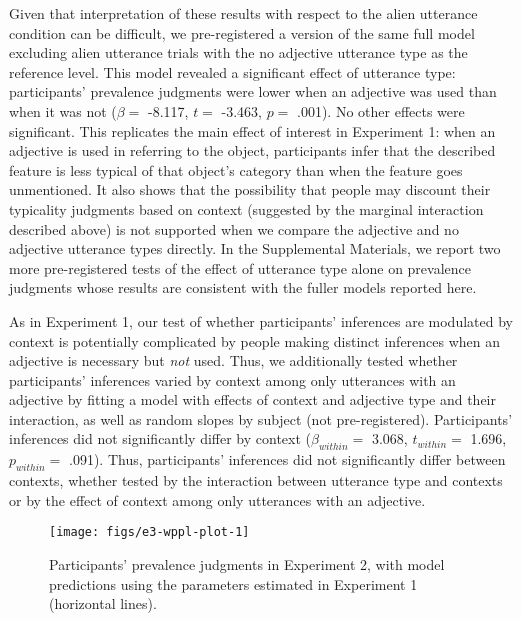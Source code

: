 \documentclass{ucetd}
\begin{document}
Given that interpretation of these results with respect to the alien
utterance condition can be difficult, we pre-registered a version of the
same full model excluding alien utterance trials with the no adjective
utterance type as the reference level. This model revealed a significant
effect of utterance type: participants' prevalence judgments were lower
when an adjective was used than when it was not (\(\beta =\) -8.117,
\(t =\) -3.463, \(p =\) .001). No other effects were significant. This
replicates the main effect of interest in Experiment 1: when an
adjective is used in referring to the object, participants infer that
the described feature is less typical of that object's category than
when the feature goes unmentioned. It also shows that the possibility
that people may discount their typicality judgments based on context
(suggested by the marginal interaction described above) is not supported
when we compare the adjective and no adjective utterance types directly.
In the Supplemental Materials, we report two more pre-registered tests
of the effect of utterance type alone on prevalence judgments whose
results are consistent with the fuller models reported here.

As in Experiment 1, our test of whether participants' inferences are
modulated by context is potentially complicated by people making
distinct inferences when an adjective is necessary but \emph{not} used.
Thus, we additionally tested whether participants' inferences varied by
context among only utterances with an adjective by fitting a model with
effects of context and adjective type and their interaction, as well as
random slopes by subject (not pre-registered). Participants' inferences
did not significantly differ by context (\(\beta_{within} =\) 3.068,
\(t_{within} =\) 1.696, \(p_{within} =\) .091). Thus, participants'
inferences did not significantly differ between contexts, whether tested
by the interaction between utterance type and contexts or by the effect
of context among only utterances with an adjective.

\begin{figure}[!tb]

{\centering \texttt{[image: figs/e3-wppl-plot-1]} 

}

\caption{Participants' prevalence judgments in Experiment 2, with model predictions using the parameters estimated in Experiment 1 (horizontal lines).}\label{fig:e3-wppl-plot}
\end{figure}
\end{document}
